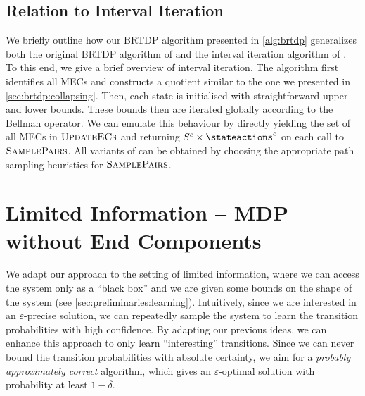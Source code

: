 \documentclass{article}
\newcommand{\States}{S}
\newcommand{\samplepath}{\textsc{SamplePairs}}
\newcommand{\updateecs}{\textsc{UpdateECs}}
\begin{document}
\subsection{Relation to Interval Iteration}

We briefly outline how our BRTDP algorithm presented in \cref{alg:brtdp} generalizes both the original BRTDP algorithm of \cite{DBLP:conf/atva/BrazdilCCFKKPU14} and the interval iteration algorithm of \cite{DBLP:conf/rp/HaddadM14}.
To this end, we give a brief overview of interval iteration.
The algorithm first identifies all MECs and constructs a quotient similar to the one we presented in \cref{sec:brtdp:collapsing}.
Then, each state is initialised with straightforward upper and lower bounds.
These bounds then are iterated globally according to the Bellman operator.
We can emulate this behaviour by directly yielding the set of all MECs in $\updateecs$ and returning $\States^c \times \stateactions^c$ on each call to $\samplepath$.
All variants of \cite{DBLP:conf/atva/BrazdilCCFKKPU14} can be obtained by choosing the appropriate path sampling heuristics for $\samplepath$.
 	\section{Limited Information -- MDP without End Components} \label{sec:dql_no_ec}

We adapt our approach to the setting of limited information, where we can access the system only as a \enquote{black box} and we are given some bounds on the shape of the system (see \cref{sec:preliminaries:learning}).
Intuitively, since we are interested in an $\varepsilon$-precise solution, we can repeatedly sample the system to learn the transition probabilities with high confidence.
By adapting our previous ideas, we can enhance this approach to only learn \enquote{interesting} transitions.
Since we can never bound the transition probabilities with absolute certainty, we aim for a \emph{probably approximately correct} algorithm, which gives an $\varepsilon$-optimal solution with probability at least $1 - \delta$.
\end{document}
